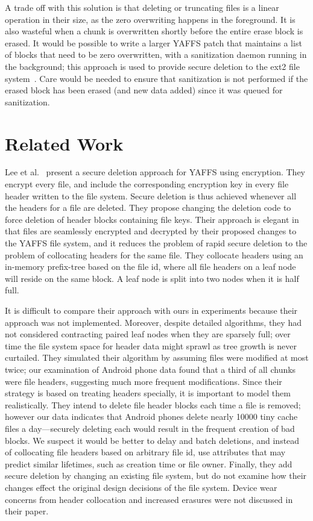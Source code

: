 \documentclass{acmtog}
\begin{document}
A trade off with this solution is that deleting or truncating files is a linear
operation in their size, as the zero overwriting happens in the foreground. It is
also wasteful when a chunk is overwritten shortly before the entire erase
block is erased. It would be
possible to write a larger YAFFS patch that maintains a list of blocks
that need to be zero overwritten, with a sanitization daemon running in the
background; this approach is used to provide secure deletion to the ext2 file
system~\cite{ext2secdel}. Care would be needed to ensure that sanitization is
not performed if the erased block has been erased (and new data added) since
it was queued for sanitization.

\section{Related Work}

Lee et al.~\cite{treeyaffs} present a secure deletion approach for
YAFFS using encryption. They encrypt every file, and include the
corresponding encryption key in every file header written to the file system.
Secure deletion is thus achieved whenever
all the headers for a file are deleted. They propose changing the deletion
code to force deletion of header blocks containing file keys. Their approach
is elegant in that files are seamlessly encrypted and decrypted by their
proposed changes to the YAFFS file system, and it reduces the problem of rapid secure deletion to the
problem of collocating headers for the same file. They collocate headers using an
in-memory prefix-tree based on the file id, where all file headers on a leaf node
will reside on the same block. A leaf node is split into two nodes when it
is half full.

It is difficult to compare their approach with ours in experiments because
their approach was not implemented. Moreover, despite detailed algorithms, they had
not considered contracting paired leaf nodes when they are sparsely full; over
time the file system space for header data might 
sprawl as tree growth is never curtailed.
They simulated their algorithm by assuming files were modified at most twice; our examination of
Android phone data found that a third of all chunks were file headers,
suggesting much more frequent modifications. Since
their strategy is based on treating headers specially, it is important to
model them realistically. They intend to delete file header blocks
each time a file is removed; however our data indicates that Android phones delete
nearly 10000 tiny cache files a day---securely deleting each would result in
the frequent creation of bad blocks.
We suspect it would be better to delay and batch deletions, and instead of
collocating file headers based on arbitrary file id, use attributes
that may predict similar lifetimes, such as creation time or file owner.
Finally, they add secure deletion by changing an existing file
system, but do not examine how their changes effect the original design
decisions of the file system.
Device wear concerns from header collocation and
increased erasures were not discussed in their paper.
\end{document}
